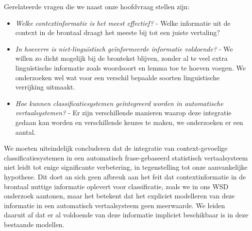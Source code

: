 Gerelateerde vragen die we naast onze hoofdvraag stellen zijn:

\begin{itemize}
\item \emph{Welke contextinformatie is het meest effectief?} - Welke informatie uit de context in de brontaal draagt het
    meeste bij tot een juiste vertaling?
\item \emph{In hoeverre is niet-linguïstisch geïnformeerde informatie voldoende?} - We willen zo dicht mogelijk bij de
    brontekst blijven, zonder al te veel extra linguïstische informatie zoals woordsoort en lemma toe te
    hoeven voegen. We onderzoeken wel wat voor een verschil bepaalde soorten linguïstische verrijking uitmaakt.
\item \emph{Hoe kunnen classificatiesystemen geïntegreerd worden in automatische vertaalsystemen?} - Er zijn
    verschillende manieren waarop deze integratie gedaan kan worden en verschillende keuzes te maken, we onderzoeken er een aantal.
\end{itemize}

We moeten uiteindelijk concluderen dat de integratie van context-gevoelige classificatiesystemen in een automatisch
frase-gebaseerd statistisch vertaalsysteem niet leidt tot enige significante verbetering, in tegenstelling tot onze
aanvankelijke hypothese. Dit doet an sich geen afbreuk aan het feit dat contextinformatie in de brontaal nuttige
informatie oplevert voor classificatie, zoals we in ons WSD onderzoek aantonen, maar het betekent dat het expliciet
modelleren van deze informatie in een automatisch vertaalsysteem geen meerwaarde. We leiden daaruit af dat er al voldoende van deze informatie impliciet beschikbaar is in deze bestaande modellen.

